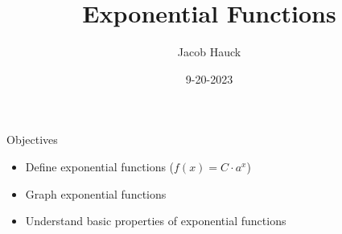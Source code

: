 \documentclass[]{beamer}
\title{Exponential Functions}
\author{Jacob Hauck}
\institute{Math 6010}
\date{9-20-2023}
\begin{document}
	\beamertemplatenavigationsymbolsempty
	
	\frame{\titlepage}
	
%		
	
	\begin{frame}{Objectives}
		\begin{itemize}
			\item Define exponential functions ($f(x) = C\cdot a^x$)
			\pause\vfill
			\item Graph exponential functions
			\pause\vfill
			\item Understand basic properties of exponential functions
		\end{itemize}
	\end{frame}
	
\end{document}
